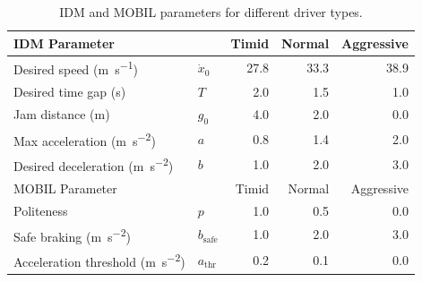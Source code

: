\begin{table}[tbph]
    \caption{IDM and MOBIL parameters for different driver types.}
    \centering
    \footnotesize
    \begin{tabular}{@{}llrrr@{}}
        \toprule
        IDM Parameter & & \hspace{-3ex} Timid & Normal & Aggressive \\
        \midrule
        Desired speed (\si{\meter\per\second}) & $\dot{x}_0$ & 27.8 & 33.3 & 38.9 \\
        Desired time gap (\si{\second}) & $T$ & 2.0  & 1.5 & 1.0 \\
        Jam distance (\si{\meter})     & $g_0$ & 4.0  & 2.0 & 0.0 \\
        Max acceleration (\si{\meter\per\second\squared}) & $a$ & 0.8  & 1.4 & 2.0 \\
        Desired deceleration (\si{\meter\per\second\squared}) & $b$ & 1.0  & 2.0 & 3.0 \\
        \midrule
        MOBIL Parameter & & \hspace{-3ex} Timid & Normal & Aggressive \\
        \midrule
        Politeness & $p$ & 1.0 & 0.5 & 0.0 \\
        Safe braking (\si{\meter\per\second\squared}) & $b_\text{safe}$ & 1.0 & 2.0 & 3.0 \\
        Acceleration threshold (\si{\meter\per\second\squared}) & $a_\text{thr}$ & 0.2 & 0.1 & 0.0 \\
        \bottomrule
    \end{tabular}
    \label{tab:modelparams}
\end{table}

